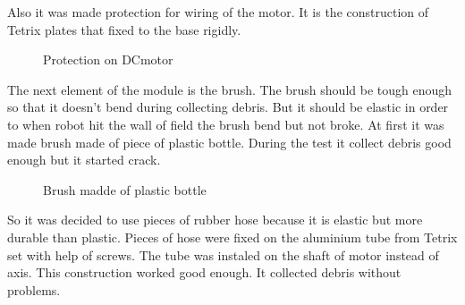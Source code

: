 	Also it was made protection for wiring of the motor. It is the construction of Tetrix plates that fixed to the base rigidly.
\begin{figure}[H]
		\begin{minipage}[h]{\linewidth}
			\caption{Protection on DCmotor}
		\end{minipage}
	\end{figure}
	The next element of the module is the brush. The brush should be tough enough so that it doesn't bend during collecting debris. But it should be elastic in order to when robot hit the wall of field the brush bend but not broke.\newline
	At first it was made brush made of piece of plastic bottle. During the test it collect debris good enough but it started crack.
	\begin{figure}[H]
		\begin{minipage}[h]{1\linewidth}
			\caption{Brush madde of plastic bottle}
		\end{minipage}
	\end{figure}
	So it was decided to use pieces of rubber hose because it is elastic but more durable than plastic. Pieces of hose were fixed on the aluminium tube from Tetrix set with help of screws. The tube was instaled on the shaft of motor instead of axis. This construction worked good enough. It collected debris without problems.  
